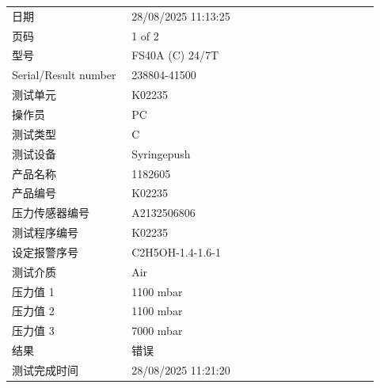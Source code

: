 \documentclass[UTF8,10pt,a4paper,fontset=fandol]{ctexart}
\newcommand{\fieldvalue}[1]{#1}
\begin{document}
\begin{tabular}{@{}p{0.30\linewidth}p{0.62\linewidth}@{}}
日期 &
\fieldvalue{28/08/2025 11:13:25}
\\
页码 &
\fieldvalue{1 of 2}
\\
型号 &
\fieldvalue{FS40A (C) 24/7T}
\\
Serial/Result number &
\fieldvalue{238804-41500}
\\
测试单元 &
\fieldvalue{K02235}
\\
操作员 &
\fieldvalue{PC}
\\
测试类型 &
\fieldvalue{C}
\\
测试设备 &
\fieldvalue{Syringepush}
\\
产品名称 &
\fieldvalue{1182605}
\\
产品编号 &
\fieldvalue{K02235}
\\
压力传感器编号 &
\fieldvalue{A2132506806}
\\
测试程序编号 &
\fieldvalue{K02235}
\\
设定报警序号 &
\fieldvalue{C2H5OH-1.4-1.6-1}
\\
测试介质 &
\fieldvalue{Air}
\\
压力值 1 &
\fieldvalue{1100 mbar}
\\
压力值 2 &
\fieldvalue{1100 mbar}
\\
压力值 3 &
\fieldvalue{7000 mbar}
\\
结果 &
\fieldvalue{错误}
\\
测试完成时间 &
\fieldvalue{28/08/2025 11:21:20}
\end{tabular}
\end{document}
